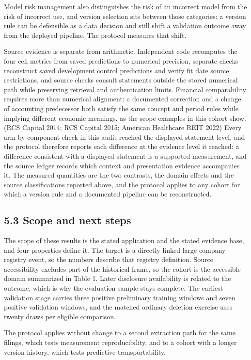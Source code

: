 \documentclass[10pt,a4paper,twocolumn]{article}
\begin{document}
Model risk management also distinguishes the risk of an incorrect model from the risk of incorrect use, and version selection sits between those categories: a version rule can be defensible as a data decision and still shift a validation outcome away from the deployed pipeline. The protocol measures that shift.

Source evidence is separate from arithmetic. Independent code recomputes the four cell metrics from saved predictions to numerical precision, separate checks reconstruct saved development control predictions and verify fit date source restrictions, and source checks consult statements outside the stored numerical path while preserving retrieval and authentication limits. Financial comparability requires more than numerical alignment: a documented correction and a change of accounting predecessor both satisfy the same concept and period rules while implying different economic meanings, as the scope examples in this cohort show. (RCS Capital 2014; RCS Capital 2015; American Healthcare REIT 2022) Every arm by component check in this audit reached the displayed statement level, and the protocol therefore reports each difference at the evidence level it reached: a difference consistent with a displayed statement is a supported measurement, and the source ledger records which context and presentation evidence accompanies it. The measured quantities are the two contrasts, the domain effects and the source classifications reported above, and the protocol applies to any cohort for which a version rule and a documented pipeline can be reconstructed.

\subsection{5.3 Scope and next steps}

The scope of these results is the stated application and the stated evidence base, and four properties define it. The target is a directly linked large company registry event, so the numbers describe that registry definition. Source accessibility excludes part of the historical frame, so the cohort is the accessible domain summarized in Table 1. Later disclosure availability is related to the outcome, which is why the evaluation sample stays complete. The earliest validation stage carries three positive preliminary training windows and seven positive validation windows, and the matched ordinary deletion exercise uses twenty draws per eligible comparison.

The protocol applies without change to a second extraction path for the same filings, which tests measurement reproducibility, and to a cohort with a longer version history, which tests predictive transportability.
\end{document}
